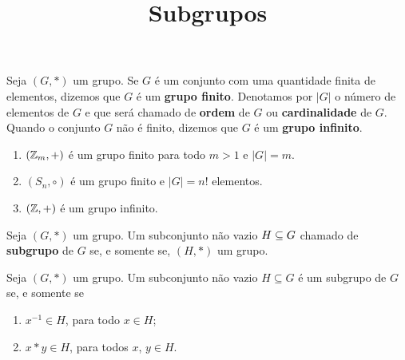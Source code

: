 \documentclass{beamer}
\title{Subgrupos}
\author[\autor]{\autor}
\institute[\instituto]{\instituto}
\date{}
\begin{document}
    \begin{frame}
        \maketitle
    \end{frame}


    \begin{frame}
        \begin{definicao}
            Seja $(G,*)$ um grupo. \pause Se $G$ {\'e} um conjunto com uma quantidade finita de elementos, \pause dizemos que $G$ {\'e} um \textbf{grupo finito}. \pause Denotamos por $|G|$ \pause o n{\'u}mero de elementos de $G$ \pause e que ser{\'a} chamado de \textbf{ordem} de $G$ \pause ou \textbf{cardinalidade} de $G$. \pause Quando o conjunto $G$ n{\~a}o {\'e} finito, \pause dizemos que $G$ {\'e} um \textbf{grupo infinito}.\pause
        \end{definicao}

        \begin{exemplos}
            \begin{enumerate}[label={\roman*})]
                \item $(\mathbb{Z}_m, +)$ {\'e} um grupo finito para todo $m>1$ \pause e $|G| = m$.\pause
                \item $(S_n, \circ)$ \'e um grupo finito \pause e $|G| = n!$ elementos.\pause
                \item $(\mathbb{Z}, +)$ {\'e} um grupo infinito.
            \end{enumerate}
        \end{exemplos}
    \end{frame}

    \begin{frame}
        \begin{definicao}
            Seja $(G,*)$ um grupo. \pause Um subconjunto n{\~a}o vazio \pause $H\subseteq G$  chamado de \textbf{subgrupo} de $G$ \pause se, e somente se, $(H,*)$  um grupo.\pause
        \end{definicao}

        \begin{proposicao}
            Seja $(G, *)$ um grupo. \pause Um subconjunto n{\~a}o vazio \pause $H\subseteq G$ {\'e} um subgrupo de $G$ \pause se, e somente se\pause
            \begin{enumerate}[label={\roman*})]
                \item\label{subgrupo_condicao_1} $x^{-1}\in H$, \pause para todo $x \in H$;
                \item\label{subgrupo_condicao_2} $x*y\in H$, \pause para todos $x$, $y \in H$.\pause
            \end{enumerate}
        \end{proposicao}
    \end{frame}
\end{document}
